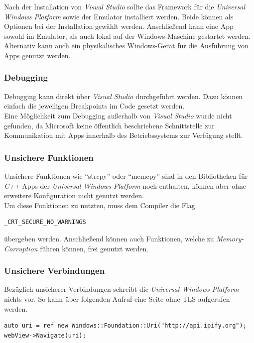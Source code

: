 			Nach der Installation von \textit{Visual Studio} sollte das Framework für die \textit{Universal Windows Platform} sowie der Emulator installiert werden. Beide können als Optionen bei der Installation gewählt werden. Anschließend kann eine App sowohl im Emulator, als auch lokal auf der Windows-Maschine gestartet werden. Alternativ kann auch ein physikalisches Windows-Gerät für die Ausführung von Apps genutzt werden.
			
			\subsubsection{Debugging}
			Debugging kann direkt über \textit{Visual Studio} durchgeführt werden. Dazu können einfach die jeweiligen Breakpoints im Code gesetzt werden.\\
			
			Eine Möglichkeit zum Debugging außerhalb von \textit{Visual Studio} wurde nicht gefunden, da Microsoft keine öffentlich beschriebene Schnittstelle zur Kommunikation mit Apps innerhalb des Betriebssystems zur Verfügung stellt.
			
			\subsubsection{Unsichere Funktionen}
			Unsichere Funktionen wie "`strcpy"' oder "`memcpy"' sind in den Bibliotheken für \textit{C++}-Apps der \textit{Universal Windows Platform} noch enthalten, können aber ohne erweitere Konfiguration nicht genutzt werden.\\
			
			Um diese Funktionen zu nutzten, muss dem Compiler die Flag 
			\begin{lstlisting}
_CRT_SECURE_NO_WARNINGS			
			\end{lstlisting}
			übergeben werden. Anschließend können auch Funktionen, welche zu \textit{Memory-Corruption} führen können, frei genutzt werden.
			
			\subsubsection{Unsichere Verbindungen}
			Bezüglich unsicherer Verbindungen schreibt die \textit{Universal Windows Platform} nichts vor. So kann über folgenden Aufruf eine Seite ohne TLS aufgerufen werden.
			\begin{lstlisting}
auto uri = ref new Windows::Foundation::Uri("http://api.ipify.org");
webView->Navigate(uri);
			\end{lstlisting}
			
